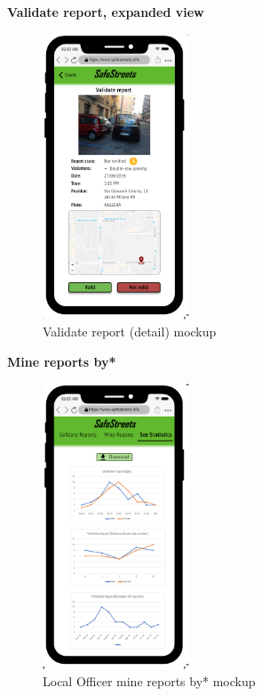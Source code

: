 					\clearpage
					\vspace{-1mm}
					\begin{center}
						{\small \textbf{Validate report, expanded view}}
					\end{center}
					\vspace{-5mm}
					\begin{figure}[!h]
						\centering
						\includegraphics[height=8.5cm]{images/MockUp/Authority/LocalOfficer/ValidateReportExpanded.png}
						\caption{Validate report (detail) mockup}
					\end{figure}
					\vspace{-2mm}
					\begin{center}
						{\small \textbf{Mine reports by*}}
					\end{center}
					\vspace{-5mm}
					\begin{figure}[!h]
						\centering
						\includegraphics[height=8.5cm]{images/MockUp/Authority/LocalOfficer/SeeStatistics.png}
						\caption{Local Officer mine reports by* mockup}
					\end{figure}
